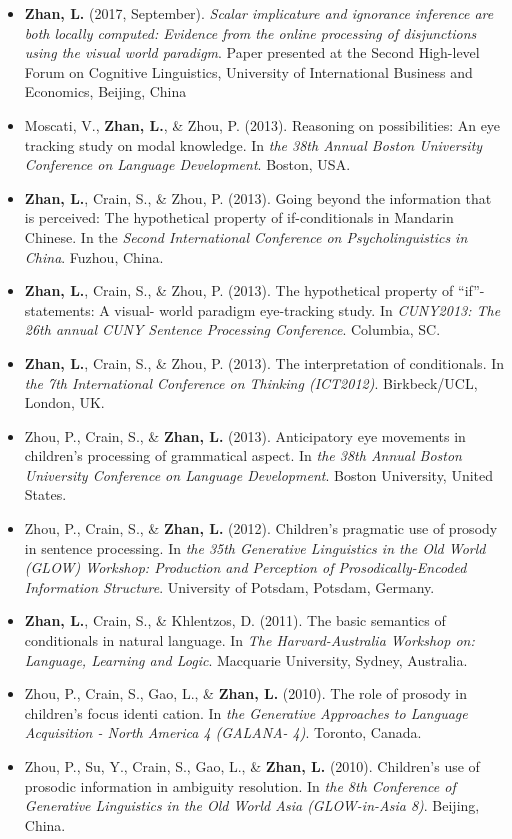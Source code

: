 \documentclass[10pt,]{article}
\begin{document}
\begin{itemize}
\item
  \textbf{Zhan, L.} (2017, September). \emph{Scalar implicature and
  ignorance inference are both locally computed: Evidence from the
  online processing of disjunctions using the visual world paradigm}.
  Paper presented at the Second High-level Forum on Cognitive
  Linguistics, University of International Business and Economics,
  Beijing, China
\item
  Moscati, V., \textbf{Zhan, L.}, \& Zhou, P. (2013). Reasoning on
  possibilities: An eye tracking study on modal knowledge. In \emph{the
  38th Annual Boston University Conference on Language Development}.
  Boston, USA.
\item
  \textbf{Zhan, L.}, Crain, S., \& Zhou, P. (2013). Going beyond the
  information that is perceived: The hypothetical property of
  if-conditionals in Mandarin Chinese. In the \emph{Second International
  Conference on Psycholinguistics in China}. Fuzhou, China.
\item
  \textbf{Zhan, L.}, Crain, S., \& Zhou, P. (2013). The hypothetical
  property of ``if''-statements: A visual- world paradigm eye-tracking
  study. In \emph{CUNY2013: The 26th annual CUNY Sentence Processing
  Conference}. Columbia, SC.
\item
  \textbf{Zhan, L.}, Crain, S., \& Zhou, P. (2013). The interpretation
  of conditionals. In \emph{the 7th International Conference on Thinking
  (ICT2012)}. Birkbeck/UCL, London, UK.
\item
  Zhou, P., Crain, S., \& \textbf{Zhan, L.} (2013). Anticipatory eye
  movements in children's processing of grammatical aspect. In \emph{the
  38th Annual Boston University Conference on Language Development}.
  Boston University, United States.
\item
  Zhou, P., Crain, S., \& \textbf{Zhan, L.} (2012). Children's pragmatic
  use of prosody in sentence processing. In \emph{the 35th Generative
  Linguistics in the Old World (GLOW) Workshop: Production and
  Perception of Prosodically-Encoded Information Structure}. University
  of Potsdam, Potsdam, Germany.
\item
  \textbf{Zhan, L.}, Crain, S., \& Khlentzos, D. (2011). The basic
  semantics of conditionals in natural language. In \emph{The
  Harvard-Australia Workshop on: Language, Learning and Logic}.
  Macquarie University, Sydney, Australia.
\item
  Zhou, P., Crain, S., Gao, L., \& \textbf{Zhan, L.} (2010). The role of
  prosody in children's focus identi cation. In \emph{the Generative
  Approaches to Language Acquisition - North America 4 (GALANA- 4)}.
  Toronto, Canada.
\item
  Zhou, P., Su, Y., Crain, S., Gao, L., \& \textbf{Zhan, L.} (2010).
  Children's use of prosodic information in ambiguity resolution. In
  \emph{the 8th Conference of Generative Linguistics in the Old World
  Asia (GLOW-in-Asia 8)}. Beijing, China.
\end{itemize}
\end{document}
